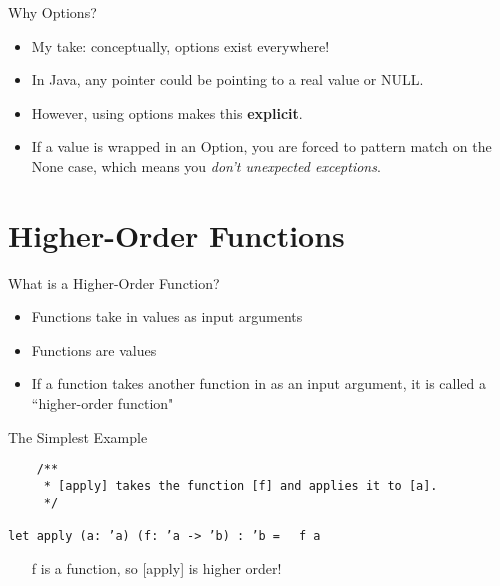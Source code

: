 \documentclass{beamer}
\begin{document}
    \begin{frame}{Why Options?}
    \begin{itemize}
        \item My take: conceptually, options exist everywhere!
        \item In Java, any pointer could be pointing to a real value or NULL.
        \item However, using options makes this \textbf{explicit}.
        \item If a value is wrapped in an Option, you are forced to pattern match on the None case, which means you \textit{don't unexpected exceptions}.
    \end{itemize}
    \end{frame}
    
    \section{Higher-Order Functions}
    \begin{frame}[fragile]{What is a Higher-Order Function?}\pause
    \begin{itemize}
        \item Functions take in values as input arguments \pause
        \item Functions are values \pause
        \item If a function takes another function in as an input argument, it is called a ``higher-order function"
    \end{itemize}
    \end{frame}
    
    \begin{frame}[fragile]{The Simplest Example}
    \begin{verbatim}
    /**
     * [apply] takes the function [f] and applies it to [a].
     */
    \end{verbatim}
    \texttt{let apply (a: 'a) (f: 'a -> 'b) : 'b = }\pause
    \texttt{ f a}
    
    \pause
    \begin{itemize}
        \item [f] is a function, so [apply] is higher order!
    \end{itemize}
        
    \end{frame}
    
\end{document}
